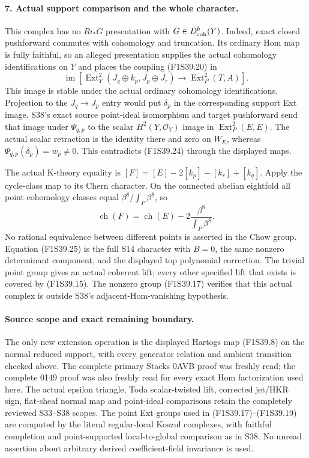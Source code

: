 \paragraph{7. Actual support comparison and the whole character.}
This complex has no $Ri_*G$ presentation
with $G\in D^b_{\rm coh}(Y)$. Indeed,
exact closed pushforward commutes with
cohomology and truncation. Its ordinary
Hom map is fully faithful, so an alleged
presentation supplies the actual cohomology
identifications on $Y$ and places the
coupling (F1S39.20) in
\[
 \operatorname{im}\left[
   \operatorname{Ext}^2_Y(J_q\oplus k_p,J_p\oplus J_r)
      \longrightarrow\operatorname{Ext}^2_P(T,A)\right].
 \tag{F1S39.24}
\]
This image is stable under the actual
ordinary cohomology identifications.
Projection to the $J_q\to J_p$ entry
would put $\delta_p$ in the corresponding
support Ext image. S38's exact source
point-ideal isomorphism and target pushforward
send that image under $\Psi_{q,p}$ to the
scalar $H^2(Y,\mathcal O_Y)$ image in
$\operatorname{Ext}^2_P(E,E)$.
The actual scalar retraction is the identity
there and zero on $W_E$, whereas
$\Psi_{q,p}(\delta_p)=w_p\ne0$.
This contradicts (F1S39.24) through the
displayed maps.

The actual K-theory equality is
$[F]=[E]-2[k_p]-[k_r]+[k_q]$.
Apply the cycle-class map to its Chern
character. On the connected abelian
eightfold all point cohomology classes
equal $\beta^8/\int_P\beta^8$, so
\[
 \operatorname{ch}(F)=\operatorname{ch}(E)
                  -2\frac{\beta^8}{\int_P\beta^8}.
 \tag{F1S39.25}
\]
No rational equivalence between different
points is asserted in the Chow group.
Equation (F1S39.25) is the full S14
character with $B=0$, the same nonzero
determinant component, and the displayed
top polynomial correction. The trivial
point group gives an actual coherent lift;
every other specified lift that exists
is covered by (F1S39.15).
The nonzero group (F1S39.17) verifies that
this actual complex is outside S38's
adjacent-Hom-vanishing hypothesis.

\paragraph{Source scope and exact remaining boundary.}
The only new extension operation is the
displayed Hartogs map (F1S39.8) on the
normal reduced support, with every generator
relation and ambient transition checked above.
The complete primary Stacks 0AVB proof was
freshly read; the complete 0149 proof was
also freshly read for every exact Hom
factorization used here. The actual epsilon
triangle, Toda scalar-twisted lift, corrected
jet/HKR sign, flat-sheaf normal map and
point-ideal comparisons retain the completely
reviewed S33--S38 scopes. The point Ext
groups used in (F1S39.17)--(F1S39.19) are
computed by the literal regular-local Koszul
complexes, with faithful completion and
point-supported local-to-global comparison
as in S38. No unread assertion about arbitrary
derived coefficient-field invariance is used.

